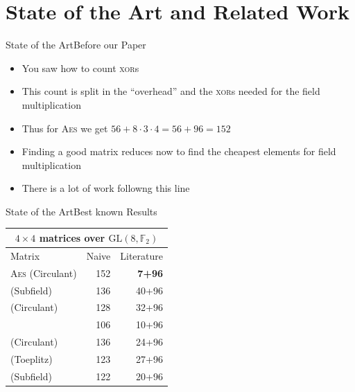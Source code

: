 \section{State of the Art and Related Work}
\begin{frame}{State of the Art}{Before our Paper}
    \begin{itemize}
        \item You saw how to count \textsc{xor}s
        \item This count is split in the \enquote{overhead} and the \textsc{xor}s needed for the field multiplication
        \item Thus for \textsc{Aes} we get $56+8\cdot3\cdot4 = 56+96 = 152$
        \item Finding a good matrix reduces now to find the cheapest elements for field multiplication
        \item There is a lot of work followng this line~\cite{FSE:SKOP15,FSE:LiuSim16,FSE:LiWan16,C:BeiKraLea16,ToSC:SarSye16,EPRINT:JeaPeySim17,ACISP:SarSye17,EPRINT:ZhoWanSun17,ToSC:LiWan17,AFC:SarSim16}
    \end{itemize}
\end{frame}

\begin{frame}{State of the Art}{Best known Results}
    \centering
    \begin{tabular}{lrr}
        \toprule
        \multicolumn{3}{c}{$4 \times 4$ matrices over $\mathrm{GL}(8,\mathbb{F}_2)$}                                                  \\
        \midrule
        Matrix                               & Naive & Literature \\
        \midrule
        \textsc{Aes} (Circulant)             &  152  & \textbf{7+96}   \\ \rowcolor{gray!10}
        \midrule
        \cite{FSE:SKOP15} (Subfield)         &  136  &    40+96   \\
        \cite{FSE:LiuSim16}  (Circulant)     &  128  &    32+96   \\ \rowcolor{gray!10}
        \cite{FSE:LiWan16}                   &  106  &    10+96   \\
        \cite{C:BeiKraLea16} (Circulant)     &  136  &    24+96   \\ \rowcolor{gray!10}
        \cite{ToSC:SarSye16} (Toeplitz)      &  123  &    27+96   \\
        \cite{EPRINT:JeaPeySim17} (Subfield) &  122  &    20+96   \\
        \bottomrule
    \end{tabular}
\end{frame}

